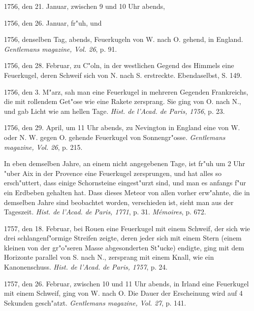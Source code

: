 \documentclass[a4paper, 11pt, oneside, polutonikogreek, german]{article}
\begin{document}
1756, den 21. Januar, zwischen 9 und 10 Uhr abends,

1756, den 26. Januar, fr"uh, und

1756, denselben Tag, abends, Feuerkugeln von W. nach O. gehend, in England. \emph{Gentlemans magazine, Vol. 26}, p. 91.

1756, den 28. Februar, zu C"oln, in der westlichen Gegend des Himmels eine Feuerkugel, deren Schweif sich von N. nach S. erstreckte. Ebendaselbst, S. 149.

1756, den 3. M"arz, sah man eine Feuerkugel in mehreren Gegenden Frankreichs, die mit rollendem Get"ose wie eine Rakete zersprang. Sie ging von O. nach N., und gab Licht wie am hellen Tage. \emph{Hist. de l'Acad. de Paris, 1756}, p. 23.

1756, den 29. April, um 11 Uhr abends, zu Nevington in England eine von W. oder N. W. gegen O. gehende Feuerkugel von Sonnengr"osse. \emph{Gentlemans magazine, Vol. 26}, p. 215.

In eben demselben Jahre, an einem nicht angegebenen Tage, ist fr"uh um 2 Uhr "uber Aix in der Provence eine Feuerkugel zersprungen, und hat alles so ersch"uttert, dass einige Schornsteine eingest"urzt sind, und man es anfangs f"ur ein Erdbeben gehalten hat. Dass dieses Meteor von allen vorher erw"ahnte, die in demselben Jahre sind beobachtet worden, verschieden ist, sieht man aus der Tageszeit. \emph{Hist. de l'Acad. de Paris, 1771}, p. 31. \emph{Mémoires}, p. 672.

1757, den 18. Februar, bei Rouen eine Feuerkugel mit einem Schweif, der sich wie drei schlangenf"ormige Streifen zeigte, deren jeder sich mit einem Stern (einem kleinen von der gr"o"seren Masse abgesonderten St"ucke) endigte, ging mit dem Horizonte parallel von S. nach N., zersprang mit einem Knall, wie ein Kanonenschuss. \emph{Hist. de l'Acad. de Paris, 1757}, p. 24.

1757, den 26. Februar, zwischen 10 und 11 Uhr abends, in Irland eine Feuerkugel mit einem Schweif, ging von W. nach O. Die Dauer der Erscheinung wird auf 4 Sekunden gesch"atzt. \emph{Gentlemans magazine, Vol. 27}, p. 141.
\end{document}
